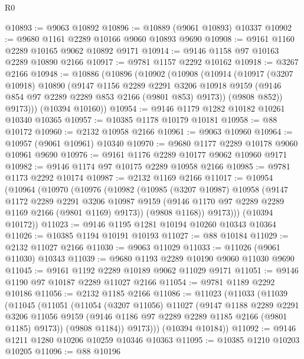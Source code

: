 \begin{lexlean}{R0}
\begin{coremodule}
@10893 := @9063 @10892
@10896 := @10889 (@9061 @10893) @10337
@10902 := @9680 @1161 @2289 @10166 @9060 @10893 @9690
@10908 := @9161 @1160 @2289 @10165 @9062 @10892 @9171
@10914 := @9146 @1158 @97 @10163 @2289 @10890 @2166
@10917 := @9781 @1157 @2292 @10162
@10918 := @3267 @2166
@10948 := @10886
    (@10896
      (@10902
        (@10908
          (@10914
            (@10917
              (@3207 @10918)
              @10890
              (@9147
                @1156
                @2289
                @2291
                @3206
                @10918
                @9159
                (@9146 @854 @97 @2289 @2289 @853 @2166 (@9801 @853) @9173))
              (@9808 @852))
            @9173)))
      (@10394 @10160))
@10954 := @9146 @1179 @1282 @10182 @10261 @10340 @10365
@10957 := @10385 @1178 @10179 @10181
@10958 := @88 @10172
@10960 := @2132 @10958 @2166
@10961 := @9063 @10960
@10964 := @10957 (@9061 @10961) @10340
@10970 := @9680 @1177 @2289 @10178 @9060 @10961 @9690
@10976 := @9161 @1176 @2289 @10177 @9062 @10960 @9171
@10982 := @9146 @1174 @97 @10175 @2289 @10958 @2166
@10985 := @9781 @1173 @2292 @10174
@10987 := @2132 @1169 @2166
@11017 := @10954
    (@10964
      (@10970
        (@10976
          (@10982
            (@10985
              (@3207 @10987)
              @10958
              (@9147
                @1172
                @2289
                @2291
                @3206
                @10987
                @9159
                (@9146 @1170 @97 @2289 @2289 @1169 @2166 (@9801 @1169) @9173))
              (@9808 @1168))
            @9173)))
      (@10394 @10172))
@11023 := @9146 @1195 @1281 @10194 @10260 @10343 @10364
@11026 := @10385 @1194 @10191 @10193
@11027 := @88 @10184
@11029 := @2132 @11027 @2166
@11030 := @9063 @11029
@11033 := @11026 (@9061 @11030) @10343
@11039 := @9680 @1193 @2289 @10190 @9060 @11030 @9690
@11045 := @9161 @1192 @2289 @10189 @9062 @11029 @9171
@11051 := @9146 @1190 @97 @10187 @2289 @11027 @2166
@11054 := @9781 @1189 @2292 @10186
@11056 := @2132 @1185 @2166
@11086 := @11023
    (@11033
      (@11039
        (@11045
          (@11051
            (@11054
              (@3207 @11056)
              @11027
              (@9147
                @1188
                @2289
                @2291
                @3206
                @11056
                @9159
                (@9146 @1186 @97 @2289 @2289 @1185 @2166 (@9801 @1185) @9173))
              (@9808 @1184))
            @9173)))
      (@10394 @10184))
@11092 := @9146 @1211 @1280 @10206 @10259 @10346 @10363
@11095 := @10385 @1210 @10203 @10205
@11096 := @88 @10196

\end{coremodule}
\end{lexlean}
